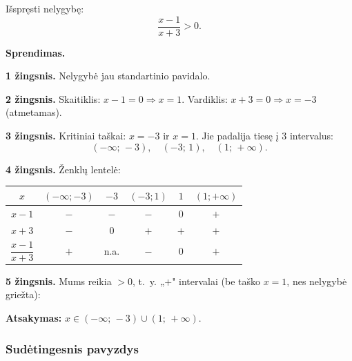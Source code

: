 \begin{example}
Išspręsti nelygybę:
\[
    \frac{x-1}{x+3} > 0.
\]

\textbf{Sprendimas.}

\textbf{1 žingsnis.} Nelygybė jau standartinio pavidalo.

\textbf{2 žingsnis.} Skaitiklis: $x - 1 = 0 \Rightarrow x = 1$. Vardiklis: $x + 3 = 0 \Rightarrow x = -3$ (atmetamas).

\textbf{3 žingsnis.} Kritiniai taškai: $x = -3$ ir $x = 1$. Jie padalija tiesę į 3 intervalus:
\[
    (-\infty;\, -3), \quad (-3;\, 1), \quad (1;\, +\infty).
\]

\textbf{4 žingsnis.} Ženklų lentelė:

\begin{center}
\begin{tabular}{c|ccccc}
$x$ & $(-\infty;-3)$ & $-3$ & $(-3;1)$ & $1$ & $(1;+\infty)$ \\
\hline
$x-1$ & $-$ & $-$ & $-$ & $0$ & $+$ \\
$x+3$ & $-$ & $0$ & $+$ & $+$ & $+$ \\
\hline
$\dfrac{x-1}{x+3}$ & $+$ & n.a. & $-$ & $0$ & $+$ \\
\end{tabular}
\end{center}

\textbf{5 žingsnis.} Mums reikia $> 0$, t.~y. „$+$" intervalai (be taško $x=1$, nes nelygybė griežta):

\textbf{Atsakymas:} $x \in (-\infty;\, -3) \cup (1;\, +\infty)$.
\end{example}

\subsubsection*{Sudėtingesnis pavyzdys}

